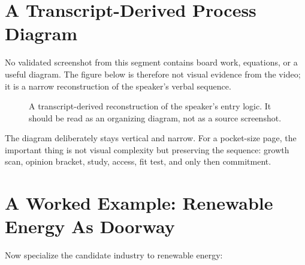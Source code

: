 \section{A Transcript-Derived Process Diagram}

No validated screenshot from this segment contains board work, equations, or a useful diagram. The figure below is therefore not visual evidence from the video; it is a narrow reconstruction of the speaker's verbal sequence.

\begin{figure}
\centering
{}
\caption{A transcript-derived reconstruction of the speaker's entry logic. It should be read as an organizing diagram, not as a source screenshot.}
\end{figure}

The diagram deliberately stays vertical and narrow. For a pocket-size page, the important thing is not visual complexity but preserving the sequence: growth scan, opinion bracket, study, access, fit test, and only then commitment.

\section{A Worked Example: Renewable Energy As Doorway}

Now specialize the candidate industry to renewable energy:

